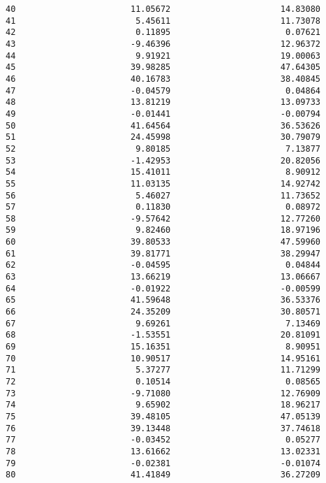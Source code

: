 \documentclass[11pt]{article}
\begin{document}
\begin{tcolorbox}[breakable, size=fbox, boxrule=.5pt, pad at break*=1mm, opacityfill=0]
\begin{Verbatim}[commandchars=\\\{\}]
40                       11.05672                      14.83080
41                        5.45611                      11.73078
42                        0.11895                       0.07621
43                       -9.46396                      12.96372
44                        9.91921                      19.00063
45                       39.98285                      47.64305
46                       40.16783                      38.40845
47                       -0.04579                       0.04864
48                       13.81219                      13.09733
49                       -0.01441                      -0.00794
50                       41.64564                      36.53626
51                       24.45998                      30.79079
52                        9.80185                       7.13877
53                       -1.42953                      20.82056
54                       15.41011                       8.90912
55                       11.03135                      14.92742
56                        5.46027                      11.73652
57                        0.11830                       0.08972
58                       -9.57642                      12.77260
59                        9.82460                      18.97196
60                       39.80533                      47.59960
61                       39.81771                      38.29947
62                       -0.04595                       0.04844
63                       13.66219                      13.06667
64                       -0.01922                      -0.00599
65                       41.59648                      36.53376
66                       24.35209                      30.80571
67                        9.69261                       7.13469
68                       -1.53551                      20.81091
69                       15.16351                       8.90951
70                       10.90517                      14.95161
71                        5.37277                      11.71299
72                        0.10514                       0.08565
73                       -9.71080                      12.76909
74                        9.65902                      18.96217
75                       39.48105                      47.05139
76                       39.13448                      37.74618
77                       -0.03452                       0.05277
78                       13.61662                      13.02331
79                       -0.02381                      -0.01074
80                       41.41849                      36.27209

\end{Verbatim}
\end{tcolorbox}
\end{document}
